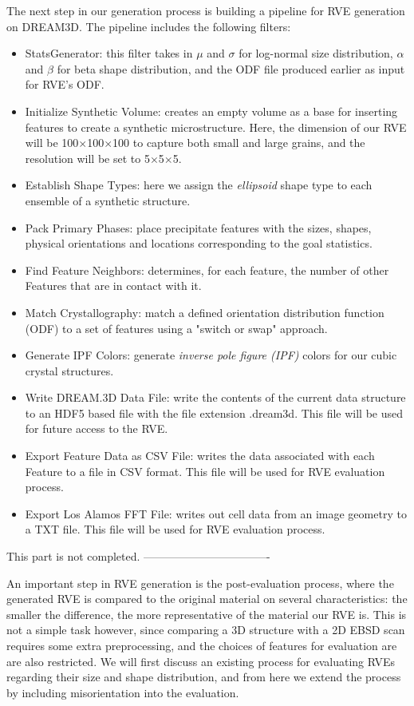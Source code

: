 The next step in our generation process is building a pipeline for RVE generation on DREAM3D. The pipeline includes the following filters:
\begin{itemize}
    \item StatsGenerator: this filter takes in $\mu$ and $\sigma$ for log-normal size distribution, $\alpha$ and $\beta$ for beta shape distribution, and the ODF file produced earlier as input for RVE's ODF.
    \item Initialize Synthetic Volume: creates an empty volume as a base for inserting features to create a synthetic microstructure. Here, the dimension of our RVE will be 100$\times$100$\times$100 to capture both small and large grains, and the resolution will be set to 5$\times$5$\times$5. %
    \item Establish Shape Types: here we assign the \textit{ellipsoid} shape type to each ensemble of a synthetic structure.
    \item Pack Primary Phases: place precipitate features with the sizes, shapes, physical orientations and locations corresponding to the goal statistics.
    \item Find Feature Neighbors: determines, for each feature, the number of other Features that are in contact with it.
    \item Match Crystallography: match a defined orientation distribution function (ODF) to a set of features using a "switch or swap" approach.
    \item Generate IPF Colors: generate \textit{inverse pole figure (IPF)} colors for our cubic crystal structures.
    \item Write DREAM.3D Data File: write the contents of the current data structure to an HDF5 based file with the file extension .dream3d. This file will be used for future access to the RVE.
    \item Export Feature Data as CSV File: writes the data associated with each Feature to a file in CSV format. This file will be used for RVE evaluation process.
    \item Export Los Alamos FFT File: writes out cell data from an image geometry to a TXT file. This file will be used for RVE evaluation process.
\end{itemize}
This part is not completed.
----------------------------------

An important step in RVE generation is the post-evaluation process, where the generated RVE is compared to the original material on several characteristics: the smaller the difference, the more representative of the material our RVE is. This is not a simple task however, since comparing a 3D structure with a 2D EBSD scan requires some extra preprocessing, and the choices of features for evaluation are are also restricted. We will first discuss an existing process for evaluating RVEs regarding their size and shape distribution, and from here we extend the process by including misorientation into the evaluation.

